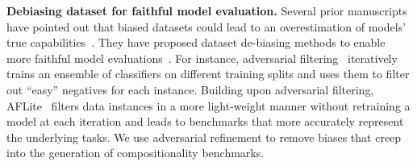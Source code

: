 \textbf{Debiasing dataset for faithful model evaluation.}
Several prior manuscripts have pointed out that biased datasets could lead to an overestimation of models' true capabilities~\cite{gururangan-etal-2018-annotation}. They have proposed dataset de-biasing methods to enable more faithful model evaluations~\cite{reif2023fighting,zellers2018swag,sakaguchi2021winogrande,le2020adversarial}. For instance, adversarial filtering~\cite{zellers2018swag} iteratively trains an ensemble of classifiers on different training splits and uses them to filter out ``easy'' negatives for each instance.
Building upon adversarial filtering, AFLite~\cite{sakaguchi2021winogrande,le2020adversarial} filters data instances in a more light-weight manner without retraining a model at each iteration and leads to benchmarks that more accurately represent the underlying tasks.
We use adversarial refinement to remove biases that creep into the generation of compositionality benchmarks.
